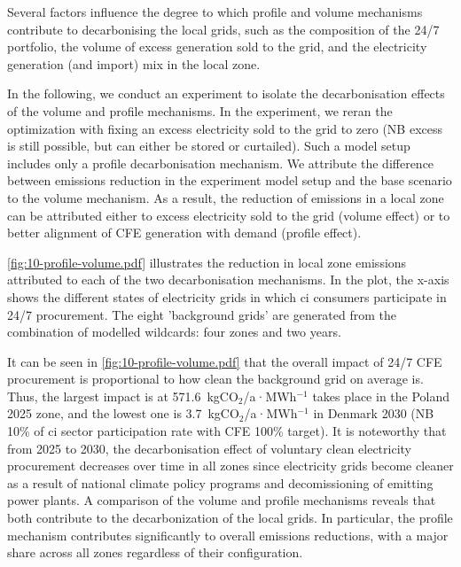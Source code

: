Several factors influence the degree to which profile and volume mechanisms contribute to decarbonising the local grids, such as the composition of the 24/7 portfolio, the volume of excess generation sold to the grid, and the electricity generation (and import) mix in the local zone.

In the following, we conduct an experiment to isolate the decarbonisation effects of the volume and profile mechanisms.
In the experiment, we reran the optimization with fixing an excess electricity sold to the grid to zero (NB excess is still possible, but can either be stored or curtailed). 
Such a model setup includes only a profile decarbonisation mechanism. 
We attribute the difference between emissions reduction in the experiment model setup and the base scenario to the volume mechanism.
As a result, the reduction of \co emissions in a local zone can be attributed either to excess electricity sold to the grid (volume effect) or to better alignment of CFE generation with demand (profile effect).

\cref{fig:10-profile-volume.pdf} illustrates the reduction in local zone emissions attributed to each of the two decarbonisation mechanisms.
In the plot, the x-axis shows the different states of electricity grids in which \gls{ci} consumers participate in 24/7 procurement.
The eight 'background grids' are generated from the combination of modelled wildcards: four zones and two years.

It can be seen in \cref{fig:10-profile-volume.pdf} that the overall impact of 24/7 CFE procurement is proportional to how clean the background grid on average is.
Thus, the largest impact is at 571.6~kgCO$_2$/a·MWh$^{-1}$ takes place in the Poland 2025 zone, and the lowest one is 3.7~kgCO$_2$/a·MWh$^{-1}$ in Denmark 2030 (NB 10\% of \gls{ci} sector participation rate with CFE 100\% target).
It is noteworthy that from 2025 to 2030, the decarbonisation effect of voluntary clean electricity procurement decreases over time in all zones since electricity grids become cleaner as a result of national climate policy programs and decomissioning of emitting power plants.
A comparison of the volume and profile mechanisms reveals that both contribute to the decarbonization of the local grids.
In particular, the profile mechanism contributes significantly to overall emissions reductions, with a major share across all zones regardless of their configuration.

